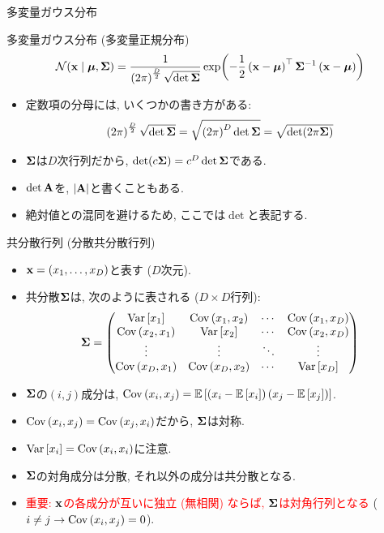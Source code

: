 \documentclass[dvipdfmx,notheorems,t]{beamer}
\begin{document}
\begin{frame}{多変量ガウス分布}
\begin{block}{多変量ガウス分布 (多変量正規分布)}
  \begin{align*}
    \mathcal{N}(\vb{x} \mid \vb*{\mu}, \vb{\Sigma})
      = \frac{1}{\left( 2\pi \right)^\frac{D}{2} \sqrt{\det \vb{\Sigma}}}
        \exp(-\frac{1}{2} \left( \vb{x} - \vb*{\mu} \right)^\top \vb{\Sigma}^{-1}
        \left( \vb{x} - \vb*{\mu} \right))
  \end{align*}
\end{block}

\begin{itemize}
  \item 定数項の分母には, いくつかの書き方がある:
  \begin{align*}
    \left( 2\pi \right)^\frac{D}{2} \sqrt{\det \vb{\Sigma}}
    = \sqrt{\left( 2\pi \right)^D \det \vb{\Sigma}}
    = \sqrt{\det(2\pi \vb{\Sigma})}
  \end{align*}
  \item $\vb{\Sigma}$は$D$次行列だから, $\det(c \vb{\Sigma}) = c^D \det \vb{\Sigma}$である.
  \item $\det \vb{A}$を, $\left| \vb{A} \right|$と書くこともある.
  \item 絶対値との混同を避けるため, ここでは$\det$と表記する.
\end{itemize}
\end{frame}

\begin{frame}{共分散行列 (分散共分散行列)}
\begin{itemize}
  \item $\vb{x} = (x_1, \ldots, x_D)$と表す ($D$次元).
  \item 共分散$\vb{\Sigma}$は, 次のように表される ($D \times D$行列):
  \begin{align*}
    \vb{\Sigma} = \mqty(\Var{x_1} & \Cov{x_1}{x_2} & \cdots & \Cov{x_1}{x_D} \\
      \Cov{x_2}{x_1} & \Var{x_2} & \cdots & \Cov{x_2}{x_D} \\
      \vdots & \vdots & \ddots & \vdots \\
      \Cov{x_D}{x_1} & \Cov{x_D}{x_2} & \cdots & \Var{x_D})
  \end{align*}
  \item $\vb{\Sigma}$の$(i, j)$成分は, $\operatorname{Cov} \left( x_i, x_j \right) = \operatorname{\mathbb{E}} \left[ \left( x_i - \operatorname{\mathbb{E}} \left[ x_i \right] \right) \left( x_j - \operatorname{\mathbb{E}} \left[ x_j \right] \right) \right]$.
  \item $\operatorname{Cov} \left( x_i, x_j \right) = \operatorname{Cov} \left( x_j, x_i \right)$だから, $\vb{\Sigma}$は対称.
  \item $\operatorname{Var} \left[ x_i \right] = \operatorname{Cov} \left( x_i, x_i \right)$に注意.
  \item $\vb{\Sigma}$の対角成分は分散, それ以外の成分は共分散となる.
  \item \textcolor{red}{重要: $\vb{x}$の各成分が互いに独立 (無相関) ならば, $\vb{\Sigma}$は対角行列となる}
  ($i \neq j \to \operatorname{Cov} \left( x_i, x_j \right) = 0$).
\end{itemize}
\end{frame}
\end{document}
